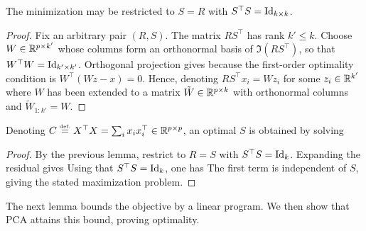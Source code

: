 \begin{lem}
	The minimization may be restricted to $S=R$ with $S^\top S = \mathrm{Id}_{k\times k}$.
\end{lem}
\begin{proof}
	Fix an arbitrary pair $(R,S)$. The matrix $R S^\top$ has rank $k' \leq k$. Choose $W \in \mathbb{R}^{p \times k'}$ whose columns form an orthonormal basis of $\Im(RS^\top)$, so that $W^\top W = \mathrm{Id}_{k' \times k'}$. Orthogonal projection gives
	because the first-order optimality condition is $W^\top(Wz-x)=0$.
	Hence, denoting $RS^\top x_i = Wz_i$ for some $z_i \in \mathbb{R}^{k'}$
	where $W$ has been extended to a matrix $\tilde W \in \mathbb{R}^{p \times k}$ with orthonormal columns and $\tilde W_{1:k'}=W$.
\end{proof}

\begin{lem}
	Denoting $C\stackrel{\mbox{\upshape\tiny def.}}{=} X^\top X=\sum_i x_ix_i^\top\in\mathbb{R}^{p\times p}$, an optimal $S$ is obtained by solving
\end{lem}
\begin{proof}
	By the previous lemma, restrict to $R=S$ with $S^\top S=\mathrm{Id}_k$. Expanding the residual gives
	Using that $S^\top S=\mathrm{Id}_k$, one has
The first term is independent of $S$, giving the stated maximization problem.
\end{proof}

The next lemma bounds the objective by a linear program. We then show that PCA attains this bound, proving optimality.

